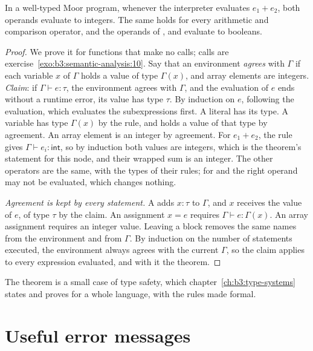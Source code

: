 \begin{theorem}\label{thm:b3:semantic-analysis:sound}
In a well-typed Moor program, whenever the interpreter evaluates $e_1 + e_2$, both operands evaluate to integers. The same holds for every arithmetic and comparison operator, and the operands of \code{&&}, \code{||} and \code{!} evaluate to booleans.
\end{theorem}

\begin{proof}
We prove it for functions that make no calls; calls are exercise~\ref{exo:b3:semantic-analysis:10}. Say that an environment \emph{agrees} with $\Gamma$ if each variable $x$ of $\Gamma$ holds a value of type $\Gamma(x)$, and array elements are integers. \emph{Claim}: if $\Gamma \vdash e : \tau$, the environment agrees with $\Gamma$, and the evaluation of $e$ ends without a runtime error, its value has type $\tau$. By induction on $e$, following the evaluation, which evaluates the subexpressions first. A literal has its type. A variable has type $\Gamma(x)$ by the rule, and holds a value of that type by agreement. An array element is an integer by agreement. For $e_1 + e_2$, the rule gives $\Gamma \vdash e_i : \mathsf{int}$, so by induction both values are integers, which is the theorem's statement for this node, and their wrapped sum is an integer. The other operators are the same, with the types of their rules; for \code{&&} and \code{||} the right operand may not be evaluated, which changes nothing.

\emph{Agreement is kept by every statement.} A  adds $x{:}\tau$ to $\Gamma$, and $x$ receives the value of $e$, of type $\tau$ by the claim. An assignment $x = e$ requires $\Gamma \vdash e : \Gamma(x)$. An array assignment requires an integer value. Leaving a block removes the same names from the environment and from $\Gamma$. By induction on the number of statements executed, the environment always agrees with the current $\Gamma$, so the claim applies to every expression evaluated, and with it the theorem.
\end{proof}

The theorem is a small case of type safety, which chapter~\ref{ch:b3:type-systems} states and proves for a whole language, with the rules made formal.

\section{Useful error messages}\label{sec:b3:semantic-analysis:messages}

